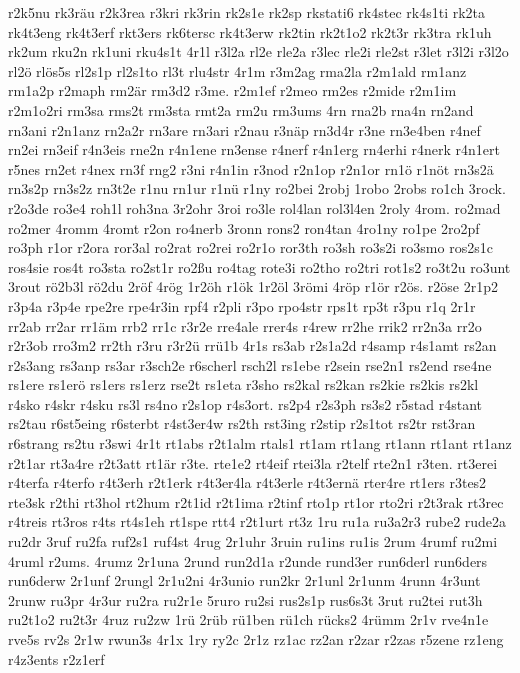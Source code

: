 {r2k5nu
rk3räu
r2k3rea
r3kri
rk3rin
rk2s1e
rk2sp
rkstati6
rk4stec
rk4s1ti
rk2ta
rk4t3eng
rk4t3erf
rkt3ers
rk6tersc
rk4t3erw
rk2tin
rk2t1o2
rk2t3r
rk3tra
rk1uh
rk2um
rku2n
rk1uni
rku4s1t
4r1l
r3l2a
rl2e
rle2a
r3lec
rle2i
rle2st
r3let
r3l2i
r3l2o
rl2ö
rlös5s
rl2s1p
rl2s1to
rl3t
rlu4str
4r1m
r3m2ag
rma2la
r2m1ald
rm1anz
rm1a2p
r2maph
rm2är
rm3d2
r3me.
r2m1ef
r2meo
rm2es
r2mide
r2m1im
r2m1o2ri
rm3sa
rms2t
rm3sta
rmt2a
rm2u
rm3ums
4rn
rna2b
rna4n
rn2and
rn3ani
r2n1anz
rn2a2r
rn3are
rn3ari
r2nau
r3näp
rn3d4r
r3ne
rn3e4ben
r4nef
rn2ei
rn3eif
r4n3eis
rne2n
r4n1ene
rn3ense
r4nerf
r4n1erg
rn4erhi
r4nerk
r4n1ert
r5nes
rn2et
r4nex
rn3f
rng2
r3ni
r4n1in
r3nod
r2n1op
r2n1or
rn1ö
r1nöt
rn3s2ä
rn3s2p
rn3s2z
rn3t2e
r1nu
rn1ur
r1nü
r1ny
ro2bei
2robj
1robo
2robs
ro1ch
3rock.
r2o3de
ro3e4
roh1l
roh3na
3r2ohr
3roi
ro3le
rol4lan
rol3l4en
2roly
4rom.
ro2mad
ro2mer
4romm
4romt
r2on
ro4nerb
3ronn
rons2
ron4tan
4ro1ny
ro1pe
2ro2pf
ro3ph
r1or
r2ora
ror3al
ro2rat
ro2rei
ro2r1o
ror3th
ro3sh
ro3s2i
ro3smo
ros2s1c
ros4sie
ros4t
ro3sta
ro2st1r
ro2ßu
ro4tag
rote3i
ro2tho
ro2tri
rot1s2
ro3t2u
ro3unt
3rout
rö2b3l
rö2du
2röf
4rög
1r2öh
r1ök
1r2öl
3römi
4röp
r1ör
r2ös.
r2öse
2r1p2
r3p4a
r3p4e
rpe2re
rpe4r3in
rpf4
r2pli
r3po
rpo4str
rps1t
rp3t
r3pu
r1q
2r1r
rr2ab
rr2ar
rr1äm
rrb2
rr1c
r3r2e
rre4ale
rrer4s
r4rew
rr2he
rrik2
rr2n3a
rr2o
r2r3ob
rro3m2
rr2th
r3ru
r3r2ü
rrü1b
4r1s
rs3ab
r2s1a2d
r4samp
r4s1amt
rs2an
r2s3ang
rs3anp
rs3ar
r3sch2e
r6scherl
rsch2l
rs1ebe
r2sein
rse2n1
rs2end
rse4ne
rs1ere
rs1erö
rs1ers
rs1erz
rse2t
rs1eta
r3sho
rs2kal
rs2kan
rs2kie
rs2kis
rs2kl
r4sko
r4skr
r4sku
rs3l
rs4no
r2s1op
r4s3ort.
rs2p4
r2s3ph
rs3s2
r5stad
r4stant
rs2tau
r6st5eing
r6sterbt
r4st3er4w
rs2th
rst3ing
r2stip
r2s1tot
rs2tr
rst3ran
r6strang
rs2tu
r3swi
4r1t
rt1abs
r2t1alm
rtals1
rt1am
rt1ang
rt1ann
rt1ant
rt1anz
r2t1ar
rt3a4re
r2t3att
rt1är
r3te.
rte1e2
rt4eif
rtei3la
r2telf
rte2n1
r3ten.
rt3erei
r4terfa
r4terfo
r4t3erh
r2t1erk
r4t3er4la
r4t3erle
r4t3ernä
rter4re
rt1ers
r3tes2
rte3sk
r2thi
rt3hol
rt2hum
r2t1id
r2t1ima
r2tinf
rto1p
rt1or
rto2ri
r2t3rak
rt3rec
r4treis
rt3ros
r4ts
rt4s1eh
rt1spe
rtt4
r2t1urt
rt3z
1ru
ru1a
ru3a2r3
rube2
rude2a
ru2dr
3ruf
ru2fa
ruf2s1
ruf4st
4rug
2r1uhr
3ruin
ru1ins
ru1is
2rum
4rumf
ru2mi
4ruml
r2ums.
4rumz
2r1una
2rund
run2d1a
r2unde
rund3er
run6derl
run6ders
run6derw
2r1unf
2rungl
2r1u2ni
4r3unio
run2kr
2r1unl
2r1unm
4runn
4r3unt
2runw
ru3pr
4r3ur
ru2ra
ru2r1e
5ruro
ru2si
rus2s1p
rus6s3t
3rut
ru2tei
rut3h
ru2t1o2
ru2t3r
4ruz
ru2zw
1rü
2rüb
rü1ben
rü1ch
rücks2
4rümm
2r1v
rve4n1e
rve5s
rv2s
2r1w
rwun3s
4r1x
1ry
ry2c
2r1z
rz1ac
rz2an
r2zar
r2zas
r5zene
rz1eng
r4z3ents
r2z1erf
}
